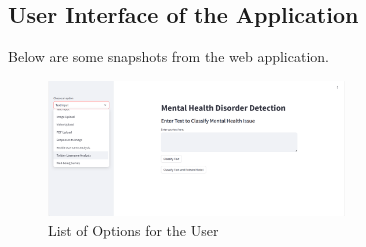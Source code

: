 \subsection{User Interface of the Application}

\noindent
Below are some snapshots from the web application.

\begin{figure}[H]  
    \centering
    \includegraphics[width=0.7\textwidth]{App Images/01 Interface.png}  
    \caption*{List of Options for the User}
    \label{01i}  %
\end{figure}


\pagebreak

